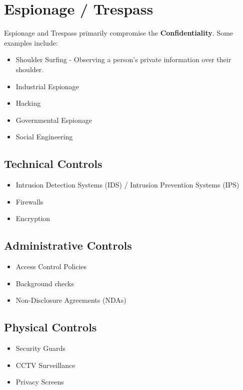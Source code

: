 \documentclass[12pt letter]{report}
\begin{document}
\section{Espionage / Trespass}



Espionage and Trespass primarily compromise the
\textbf{Confidentiality}. Some examples include:
\begin{itemize}
  \item Shoulder Surfing - Observing a person's private information
    over their shoulder.
  \item Industrial Espionage
  \item Hacking
  \item Governmental Espionage
  \item Social Engineering
\end{itemize}

\subsection{Technical Controls}
\begin{itemize}
  \item Intrusion Detection Systems (IDS) / Intrusion Prevention Systems (IPS)
  \item Firewalls
  \item Encryption
\end{itemize}

\subsection{Administrative Controls}
\begin{itemize}
  \item Access Control Policies
  \item Background checks
  \item Non-Disclosure Agreements (NDAs)
\end{itemize}

\subsection{Physical Controls}
\begin{itemize}
  \item Security Guards
  \item CCTV Surveillance
  \item Privacy Screens
\end{itemize}
\end{document}
